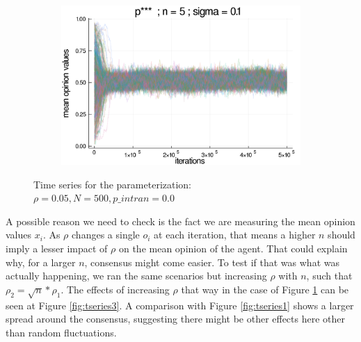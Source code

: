 \documentclass{article}
\begin{document}
\begin{figure}[H]
      \begin{subfigure}[b]{0.48\textwidth}
        \includegraphics[width=\textwidth]{img/series/tseries2/Poodlcalculatep***n5-rho005-sigma01-00intransrandom.png}
      \end{subfigure}
      \caption{Time series for the parameterization: \(\rho = 0.05, N = 500,
        p\_intran = 0.0\)}
            \label{fig:tseries2}
          \end{figure}
          
    A possible reason we need to check is the fact we are  measuring the mean opinion values \( x_i \).
    As \(\rho\) changes a single \(o_i\) at each iteration, that means a
    higher \(n\) should imply a lesser impact of \(\rho\) on the mean opinion of the
    agent. That could explain why, for a larger $n$, consensus might come easier. To test if that was what was actually happening, we ran the same scenarios but increasing \(\rho\) with \(n\), such that  \(\rho_2
    = \sqrt{n} * \rho_1 \). The effects of increasing \(\rho\) that way in the case of Figure \ref{fig:tseries2} can be seen at Figure \ref{fig:tseries3}. A comparison with Figure \ref{fig:tseries1} shows a larger spread around the consensus, suggesting there might be other effects here other than random fluctuations. 
\end{document}
